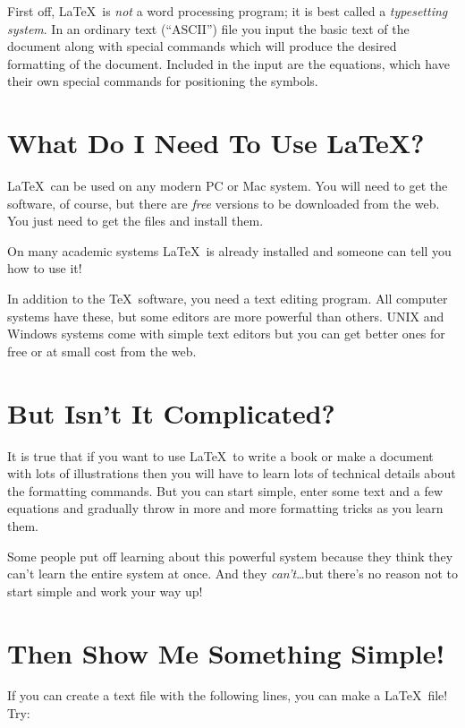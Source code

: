 \documentclass[12pt]{article}
\begin{document}
First off, \LaTeX\ is {\it not\/} a word processing program; it is
best called a {\it typesetting system\/}.  In an ordinary text
(``ASCII'') file you input the basic text of the document along
with special commands which will produce the desired formatting of
the document.  Included in the input are the equations, which have
their own special commands for positioning the symbols.

\section{What Do I Need To Use \LaTeX?}

\LaTeX\ can be used on any modern PC or Mac system. You will need
to get the software, of course, but there are {\it free\/}
versions to be downloaded from the web. You just need to get the
files and install them.

On many academic systems \LaTeX\ is already installed and someone
can tell you how to use it!

In addition to the \TeX\ software, you need a text editing
program.  All computer systems have these, but some editors are
more powerful than others.  UNIX and Windows systems come with
simple text editors but you can get better ones for free or at
small cost from the web.

\section{But Isn't It Complicated?}

It is true that if you want to use \LaTeX\ to write a book or make
a document with lots of illustrations then you will have to learn
lots of technical details about the formatting commands.  But you
can start simple, enter some text and a few equations and
gradually throw in more and more formatting tricks as you learn
them.

Some people put off learning about this powerful system because
they think they can't learn the entire system at once.  And they
{\it can't\/}\dots but there's no reason not to start simple and
work your way up!

\section{Then Show Me Something Simple!}

If you can create a text file with the following lines, you can
make a \LaTeX\ file!  Try:
\end{document}
